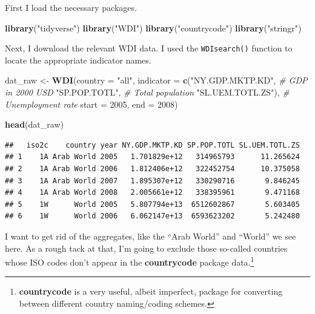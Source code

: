 \documentclass[
  12pt,
  oneside,openany]{book}
\newenvironment{Shaded}{\begin{snugshade}}{\end{snugshade}}
\newcommand{\CommentTok}[1]{\textcolor[rgb]{0.56,0.35,0.01}{\textit{#1}}}
\newcommand{\DataTypeTok}[1]{\textcolor[rgb]{0.13,0.29,0.53}{#1}}
\newcommand{\DecValTok}[1]{\textcolor[rgb]{0.00,0.00,0.81}{#1}}
\newcommand{\KeywordTok}[1]{\textcolor[rgb]{0.13,0.29,0.53}{\textbf{#1}}}
\newcommand{\NormalTok}[1]{#1}
\newcommand{\StringTok}[1]{\textcolor[rgb]{0.31,0.60,0.02}{#1}}
\begin{document}
First I load the necessary packages.

\begin{Shaded}
\begin{Highlighting}[]
\KeywordTok{library}\NormalTok{(}\StringTok{"tidyverse"}\NormalTok{)}
\KeywordTok{library}\NormalTok{(}\StringTok{"WDI"}\NormalTok{)}
\KeywordTok{library}\NormalTok{(}\StringTok{"countrycode"}\NormalTok{)}
\KeywordTok{library}\NormalTok{(}\StringTok{"stringr"}\NormalTok{)}
\end{Highlighting}
\end{Shaded}

Next, I download the relevant WDI data. I used the \texttt{WDIsearch()} function to locate the appropriate indicator names.

\begin{Shaded}
\begin{Highlighting}[]
\NormalTok{dat\_raw <{-}}\StringTok{ }\KeywordTok{WDI}\NormalTok{(}\DataTypeTok{country =} \StringTok{"all"}\NormalTok{,}
               \DataTypeTok{indicator =} \KeywordTok{c}\NormalTok{(}\StringTok{"NY.GDP.MKTP.KD"}\NormalTok{,  }\CommentTok{\# GDP in 2000 USD}
                             \StringTok{"SP.POP.TOTL"}\NormalTok{,     }\CommentTok{\# Total population}
                             \StringTok{"SL.UEM.TOTL.ZS"}\NormalTok{), }\CommentTok{\# Unemployment rate}
               \DataTypeTok{start =} \DecValTok{2005}\NormalTok{,}
               \DataTypeTok{end =} \DecValTok{2008}\NormalTok{)}

\KeywordTok{head}\NormalTok{(dat\_raw)}
\end{Highlighting}
\end{Shaded}

\begin{verbatim}
##   iso2c    country year NY.GDP.MKTP.KD SP.POP.TOTL SL.UEM.TOTL.ZS
## 1    1A Arab World 2005   1.701829e+12   314965793      11.265624
## 2    1A Arab World 2006   1.812406e+12   322452754      10.375058
## 3    1A Arab World 2007   1.895307e+12   330290716       9.846245
## 4    1A Arab World 2008   2.005661e+12   338395961       9.471168
## 5    1W      World 2005   5.807794e+13  6512602867       5.603405
## 6    1W      World 2006   6.062147e+13  6593623202       5.242480
\end{verbatim}

I want to get rid of the aggregates, like the ``Arab World'' and ``World'' we see here. As a rough tack at that, I'm going to exclude those so-called countries whose ISO codes don't appear in the \textbf{countrycode} package data.\footnote{\textbf{countrycode} is a very useful, albeit imperfect, package for converting between different country naming/coding schemes.}
\end{document}
